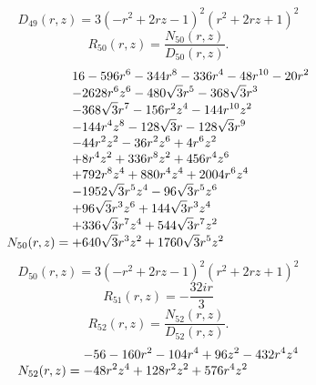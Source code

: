 \documentclass[11pt,a4paper]{article}
\begin{document}
\begin{equation}
D_{49}(r,z)=3 \left(- r^{2} + 2 r z - 1\right)^{2} \left(r^{2} + 2 r z + 1\right)^{2}
\label{eq:cat-denominator-49}
\end{equation}
\begin{equation}
R_{50}(r,z)=\frac{N_{50}(r,z)}{D_{50}(r,z)}.
\label{eq:cat-rational-50}
\end{equation}
\begin{equation}
N_{50}(r,z)=\shortstack[l]{$\displaystyle 16 - 596 r^{6} - 344 r^{8} - 336 r^{4} - 48 r^{10} - 20 r^{2}$\\
$\displaystyle  - 2628 r^{6} z^{6} - 480 \sqrt{3} r^{5} - 368 \sqrt{3} r^{3}$\\
$\displaystyle  - 368 \sqrt{3} r^{7} - 156 r^{2} z^{4} - 144 r^{10} z^{2}$\\
$\displaystyle  - 144 r^{4} z^{8} - 128 \sqrt{3} r - 128 \sqrt{3} r^{9}$\\
$\displaystyle  - 44 r^{2} z^{2} - 36 r^{2} z^{6} + 4 r^{6} z^{2}$\\
$\displaystyle  + 8 r^{4} z^{2} + 336 r^{8} z^{2} + 456 r^{4} z^{6}$\\
$\displaystyle  + 792 r^{8} z^{4} + 880 r^{4} z^{4} + 2004 r^{6} z^{4}$\\
$\displaystyle  - 1952 \sqrt{3} r^{5} z^{4} - 96 \sqrt{3} r^{5} z^{6}$\\
$\displaystyle  + 96 \sqrt{3} r^{3} z^{6} + 144 \sqrt{3} r^{3} z^{4}$\\
$\displaystyle  + 336 \sqrt{3} r^{7} z^{4} + 544 \sqrt{3} r^{7} z^{2}$\\
$\displaystyle  + 640 \sqrt{3} r^{3} z^{2} + 1760 \sqrt{3} r^{5} z^{2}$}
\label{eq:cat-numerator-50}
\end{equation}
\begin{equation}
D_{50}(r,z)=3 \left(- r^{2} + 2 r z - 1\right)^{2} \left(r^{2} + 2 r z + 1\right)^{2}
\label{eq:cat-denominator-50}
\end{equation}
\begin{equation}
R_{51}(r,z)=- \frac{32 i r}{3}
\label{eq:cat-rational-51}
\end{equation}
\begin{equation}
R_{52}(r,z)=\frac{N_{52}(r,z)}{D_{52}(r,z)}.
\label{eq:cat-rational-52}
\end{equation}
\begin{equation}
N_{52}(r,z)=\shortstack[l]{$\displaystyle  - 56 - 160 r^{2} - 104 r^{4} + 96 z^{2} - 432 r^{4} z^{4}$\\
$\displaystyle  - 48 r^{2} z^{4} + 128 r^{2} z^{2} + 576 r^{4} z^{2}$}
\label{eq:cat-numerator-52}
\end{equation}
\end{document}
